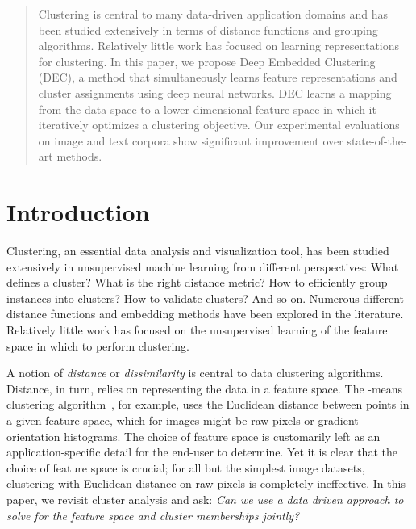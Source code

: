 \documentclass{article}
\begin{document}
 



\begin{abstract}
Clustering is central to many data-driven application domains and has been studied extensively in terms of distance functions and grouping algorithms.
Relatively little work has focused on learning representations for clustering.
In this paper, we propose Deep Embedded Clustering (DEC), a method that simultaneously learns feature representations and cluster assignments using deep neural networks.
DEC learns a mapping from the data space to a lower-dimensional feature space in which it iteratively optimizes a clustering objective.
Our experimental evaluations on image and text corpora show significant improvement over state-of-the-art methods.
\end{abstract}


 \section{Introduction}
Clustering, an essential data analysis and visualization tool, has been studied
extensively in unsupervised machine learning from different perspectives: What
defines a cluster? What is the right distance metric? How to efficiently group
instances into clusters? How to validate clusters? And so on. Numerous different
distance functions and embedding methods have been explored in the literature.
Relatively little work has focused on the unsupervised learning of the feature
space in which to perform clustering.

A notion of \emph{distance} or \emph{dissimilarity} is central to data
clustering algorithms. Distance, in turn, relies on representing the data in
a feature space. The -means clustering algorithm~\citep{macqueen1967some},
for example, uses the Euclidean distance between points in a given feature
space, which for images might be raw pixels or gradient-orientation histograms. The choice of feature space is customarily left as an application-specific detail for the end-user to determine. Yet it is clear that the choice of feature space is crucial; for all but the simplest image datasets, clustering with Euclidean distance on raw pixels is completely ineffective.
In this paper, we revisit cluster analysis and ask: \emph{Can we use a data driven approach to solve for the feature space and cluster memberships jointly?}
\end{document}
